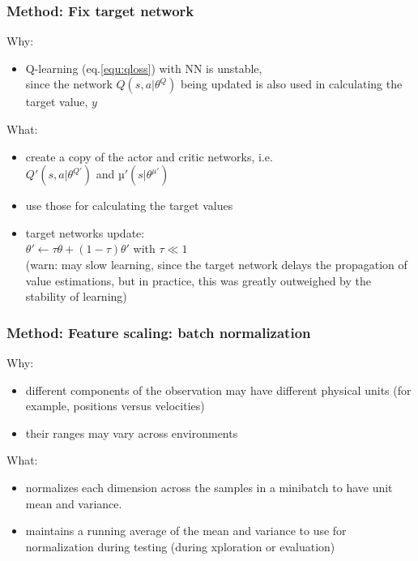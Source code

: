 \begin{frame}
\frametitle{Method: Fix target network}
Why:
\begin{itemize}
\item Q-learning (eq.\ref{equ:qloss}) with NN is unstable, \\
since the network $Q(s, a|\theta^Q)$ being updated is also used in
calculating the target value, $y$
\end{itemize}

What:
\begin{itemize}
\item create a copy of the actor and critic networks, i.e. \\
  $Q'(s, a|\theta^{Q'})$ and $µ'(s|\theta^{\mu'})$
\item use those for calculating the target values
\item target networks update: \\
    $\theta' \leftarrow \tau \theta + (1 - \tau) \theta'$ with $\tau \ll 1$\\
    (warn: may slow learning, since the target network delays the propagation of value estimations, but
    in practice, this was greatly outweighed by the stability of learning)
\end{itemize}

\end{frame}


\begin{frame}
\frametitle{Method: Feature scaling: batch normalization}
Why:
\begin{itemize}
\item different components of the observation may have different physical units (for example, positions versus velocities)
\item their ranges may vary across environments
\end{itemize}
\vspace{3mm}

What:
\begin{itemize}
\item normalizes each dimension across the samples in a minibatch to have unit mean and variance.
\item maintains a running average of the mean and variance to use for normalization during testing
(during xploration or evaluation)
\end{itemize}

\end{frame}

